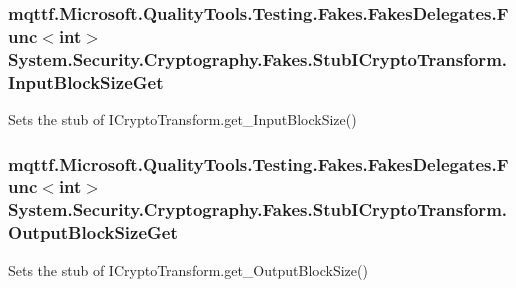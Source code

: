 \hypertarget{class_system_1_1_security_1_1_cryptography_1_1_fakes_1_1_stub_i_crypto_transform_a19a7dd3cbb673174ae9569fbf19161d8}{
\subsubsection[{Input\-Block\-Size\-Get}]{\setlength{\rightskip}{0pt plus 5cm}mqttf.\-Microsoft.\-Quality\-Tools.\-Testing.\-Fakes.\-Fakes\-Delegates.\-Func$<$int$>$ System.\-Security.\-Cryptography.\-Fakes.\-Stub\-I\-Crypto\-Transform.\-Input\-Block\-Size\-Get}}\label{class_system_1_1_security_1_1_cryptography_1_1_fakes_1_1_stub_i_crypto_transform_a19a7dd3cbb673174ae9569fbf19161d8}


Sets the stub of I\-Crypto\-Transform.\-get\-\_\-\-Input\-Block\-Size()

\hypertarget{class_system_1_1_security_1_1_cryptography_1_1_fakes_1_1_stub_i_crypto_transform_a41d55cc76154fceb3b308f6c9cc290c6}{
\subsubsection[{Output\-Block\-Size\-Get}]{\setlength{\rightskip}{0pt plus 5cm}mqttf.\-Microsoft.\-Quality\-Tools.\-Testing.\-Fakes.\-Fakes\-Delegates.\-Func$<$int$>$ System.\-Security.\-Cryptography.\-Fakes.\-Stub\-I\-Crypto\-Transform.\-Output\-Block\-Size\-Get}}\label{class_system_1_1_security_1_1_cryptography_1_1_fakes_1_1_stub_i_crypto_transform_a41d55cc76154fceb3b308f6c9cc290c6}


Sets the stub of I\-Crypto\-Transform.\-get\-\_\-\-Output\-Block\-Size()

